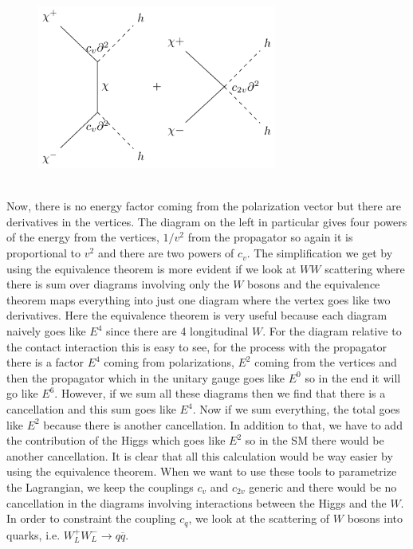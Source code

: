 \documentclass[../main.tex]{subfiles}
\begin{document}
\begin{figure}[h]
    \centering
    \includegraphics[width=0.7\textwidth]{Images/chih.pdf}
    \caption*{}
\end{figure}\\
Now, there is no energy factor coming from the polarization vector but there are derivatives in the vertices. The diagram on the left in particular gives four powers of the energy from the vertices, $1/v^2$ from the propagator so again it is proportional to $v^2$ and there are two powers of $c_v$. The simplification we get by using the equivalence theorem is more evident if we look at $WW$ scattering where there is sum over diagrams involving only the $W$ bosons and the equivalence theorem maps everything into just one diagram where the vertex goes like two derivatives. Here the equivalence theorem is very useful because each diagram naively goes like $E^4$ since there are 4 longitudinal $W$. For the diagram relative to the contact interaction this is easy to see, for the process with the propagator there is a factor $E^4$ coming from polarizations, $E^2$ coming from the vertices and then the propagator which in the unitary gauge goes like $E^0$ so in the end it will go like $E^6$. However, if we sum all these diagrams then we find that there is a cancellation and this sum goes like $E^4$. Now if we sum everything, the total goes like $E^2$ because there is another cancellation. In addition to that, we have to add the contribution of the Higgs which goes like $E^2$ so in the SM there would be another cancellation. It is clear that all this calculation would be way easier by using the equivalence theorem. When we want to use these tools to parametrize the Lagrangian, we keep the couplings $c_v$ and $c_{2v}$ generic and there would be no cancellation in the diagrams involving interactions between the Higgs and the $W$.\\
In order to constraint the coupling $c_q$, we look at the scattering of $W$ bosons into quarks, i.e. $W_L^+W_L^-\to q\overline{q}$.
\end{document}
